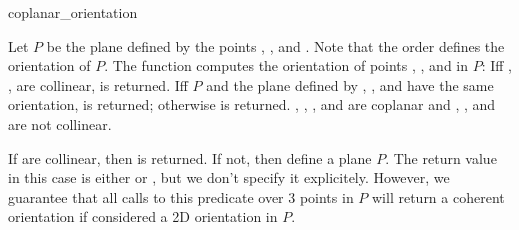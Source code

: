 \begin{ccRefFunction}{coplanar_orientation}

         {Let $P$ be the plane defined by the points , ,
          and . Note that the order defines the orientation of
          $P$. The function computes the orientation of points , 
          , and  in $P$: Iff , ,  are
          collinear,  is returned. Iff $P$ and the plane 
          defined by , , and  have the same orientation, 
           is returned; otherwise  is returned.  
          \ccPrecond {}, , , and  are coplanar and
          , , and  are not collinear.}

{If  are collinear, then  is returned.
If not, then  define a plane $P$.  The return value in this case is
either  or , but we don't specify it explicitely.
However, we guarantee that all calls to this predicate over 3 points in $P$
will return a coherent orientation if considered a 2D orientation in $P$.}

\end{ccRefFunction}

